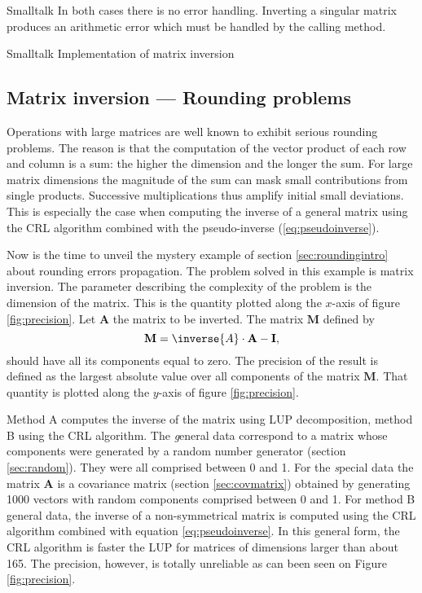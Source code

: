 \begin{displaycode}{Smalltalk}
In both cases there is no error handling. Inverting a singular
matrix produces an arithmetic error which must be handled by the
calling method.

\begin{listing}[label=lst:inversion]{Smalltalk}
{Implementation of matrix inversion}
%
%
\end{listing}

\subsection{Matrix inversion --- Rounding problems}
\label{sec:matrixrounding} Operations with large matrices are well
known to exhibit serious rounding problems. The reason is that the
computation of the vector product of each row and column is a sum:
the higher the dimension and the longer the sum. For large matrix
dimensions the magnitude of the sum can mask small contributions
from single products. Successive multiplications thus amplify
initial small deviations. This is especially the case when
computing the inverse of a general matrix using the CRL algorithm
combined with the pseudo-inverse (\ref{eq:pseudoinverse}).

Now is the time to unveil the mystery example of section
\ref{sec:roundingintro} about rounding errors propagation. The
problem solved in this example is matrix inversion. The parameter
describing the complexity of the problem is the dimension of the
matrix. This is the quantity plotted along the $x$-axis of figure
\ref{fig:precision}. Let $\textbf{A}$ the matrix to be inverted. The
matrix $\textbf{M}$ defined by
\begin{equation}
  \textbf{M}=\inverse{A}\cdot\textbf{A}-\textbf{I},
\end{equation}
should have all its components equal to zero. The precision of the
result is defined as the largest absolute value over all
components of the matrix $\textbf{M}$. That quantity is plotted along
the $y$-axis of figure \ref{fig:precision}.

Method A computes the inverse of the matrix using LUP
decomposition, method B using the CRL algorithm. The {\textsl general}
data correspond to a matrix whose components were generated by a
random number generator (\cf section \ref{sec:random}). They were
all comprised between 0 and 1. For the {\textsl special} data the
matrix $\textbf{A}$ is a covariance matrix (\cf section
\ref{sec:covmatrix}) obtained by generating 1000 vectors with
random components comprised between 0 and 1. For method B general
data, the inverse of a non-symmetrical matrix is computed using
the CRL algorithm combined with equation \ref{eq:pseudoinverse}.
In this general form, the CRL algorithm is faster the LUP for
matrices of dimensions larger than about 165. The precision,
however, is totally unreliable as can been seen on Figure
\ref{fig:precision}.


\end{displaycode}

